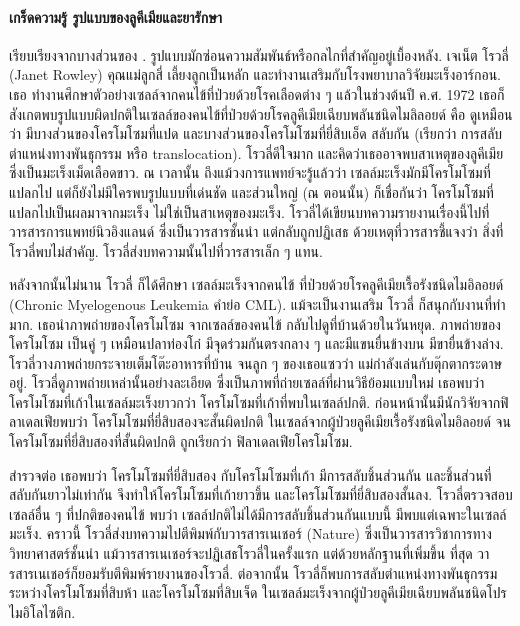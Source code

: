 {\small
	\begin{shaded}
		\paragraph{\small เกร็ดความรู้ รูปแบบของลูคีเมียและยารักษา}
		
	เรียบเรียงจากบางส่วนของ \cite{TheSerengetiRules}.
	รูปแบบมักซ่อนความสัมพันธ์หรือกลไกที่สำคัญอยู่เบื้องหลัง.
	เจเน็ต โรวลี่ (Janet Rowley) คุณแม่ลูกสี่ เลี้ยงลูกเป็นหลัก และทำงานเสริมกับโรงพยาบาลวิจัยมะเร็งอาร์กอน.
	เธอ ทำงานศึกษาตัวอย่างเซลล์จากคนไข้ที่ป่วยด้วยโรคเลือดต่าง ๆ แล้วในช่วงต้นปี ค.ศ. 1972 เธอก็สังเกตพบรูปแบบผิดปกติในเซลล์ของคนไข้ที่ป่วยด้วยโรคลูคีเมียเฉียบพลันชนิดไมลิลอยด์ 
	คือ ดูเหมือนว่า มีบางส่วนของโครโมโซมที่แปด และบางส่วนของโครโมโซมที่ยี่สิบเอ็ด สลับกัน (เรียกว่า การสลับตำแหน่งทางพันธุกรรม หรือ translocation).
	โรวลี่ดีใจมาก และคิดว่าเธออาจพบสาเหตุของลูคีเมีย ซึ่งเป็นมะเร็งเม็ดเลือดขาว.
	ณ เวลานั้น ถึงแม้วงการแพทย์จะรู้แล้วว่า เซลล์มะเร็งมักมีโครโมโซมที่แปลกไป 
	แต่ก็ยังไม่มีใครพบรูปแบบที่เด่นชัด 
และส่วนใหญ่ (ณ ตอนนั้น) ก็เชื่อกันว่า โครโมโซมที่แปลกไปเป็นผลมาจากมะเร็ง 
ไม่ใช่เป็นสาเหตุของมะเร็ง.	
	 โรวลี่ได้เขียนบทความรายงานเรื่องนี้ไปที่วารสารการแพทย์นิวอิงแลนด์ ซึ่งเป็นวารสารชั้นนำ แต่กลับถูกปฏิเสธ ด้วยเหตุที่วารสารชี้แจงว่า สิ่งที่โรวลี่พบไม่สำคัญ. โรวลี่ส่งบทความนั้นไปที่วารสารเล็ก ๆ แทน.
	 
	หลังจากนั้นไม่นาน โรวลี่ ก็ได้ศึกษา เซลล์มะเร็งจากคนไข้ ที่ป่วยด้วยโรคลูคีเมียเรื้อรังชนิดไมอิลอยด์ (Chronic Myelogenous Leukemia คำย่อ CML). 
	แม้จะเป็นงานเสริม โรวลี่ ก็สนุกกับงานที่ทำมาก.
	เธอนำภาพถ่ายของโครโมโซม จากเซลล์ของคนไข้ กลับไปดูที่บ้านด้วยในวันหยุด.
	ภาพถ่ายของโครโมโซม เป็นคู่ ๆ เหมือนปลาท่องโก๋ มีจุดร่วมกันตรงกลาง ๆ และมีแขนยื่นข้างบน มีขายื่นข้างล่าง.
	โรวลี่วางภาพถ่ายกระจายเต็มโต๊ะอาหารที่บ้าน จนลูก ๆ ของเธอแซวว่า แม่กำลังเล่นกับตุ๊กตากระดาษอยู่.
	โรวลี่ดูภาพถ่ายเหล่านั้นอย่างละเอียด ซึ่งเป็นภาพที่ถ่ายเซลล์ที่ผ่านวิธีย้อมแบบใหม่ เธอพบว่าโครโมโซมที่เก้าในเซลล์มะเร็งยาวกว่า โครโมโซมที่เก้าที่พบในเซลล์ปกติ.
	ก่อนหน้านั้นมีนักวิจัยจากฟิลาเดลเฟียพบว่า โครโมโซมที่ยี่สิบสองจะสั้นผิดปกติ ในเซลล์จากผู้ป่วยลูคีเมียเรื้อรังชนิดไมอิลอยด์ จนโครโมโซมที่ยี่สิบสองที่สั้นผิดปกติ ถูกเรียกว่า ฟิลาเดลเฟียโครโมโซม.
	
	สำรวจต่อ เธอพบว่า โครโมโซมที่ยี่สิบสอง กับโครโมโซมที่เก้า มีการสลับชิ้นส่วนกัน 
	และชิ้นส่วนที่สลับกันยาวไม่เท่ากัน
	จึงทำให้โครโมโซมที่เก้ายาวขึ้น
	และโครโมโซมที่ยี่สิบสองสั้นลง.
	โรวลี่ตรวจสอบเซลล์อื่น ๆ ที่ปกติของคนไข้ พบว่า เซลล์ปกติไม่ได้มีการสลับชิ้นส่วนกันแบบนี้ มีพบแต่เฉพาะในเซลล์มะเร็ง.
	คราวนี้ โรวลี่ส่งบทความไปตีพิมพ์กับวารสารเนเชอร์ (Nature) ซึ่งเป็นวารสารวิชาการทางวิทยาศาสตร์ชั้นนำ แม้วารสารเนเชอร์จะปฏิเสธโรวลี่ในครั้งแรก แต่ด้วยหลักฐานที่เพิ่มขึ้น ที่สุด วารสารเนเชอร์ก็ยอมรับตีพิมพ์รายงานของโรวลี่.
	ต่อจากนั้น โรวลี่ก็พบการสลับตำแหน่งทางพันธุกรรมระหว่างโครโมโซมที่สิบห้า และโครโมโซมที่สิบเจ็ด ในเซลล์มะเร็งจากผู้ป่วยลูคีเมียเฉียบพลันชนิดโปรไมอิโลไซติก.
	

\end{shaded}}
